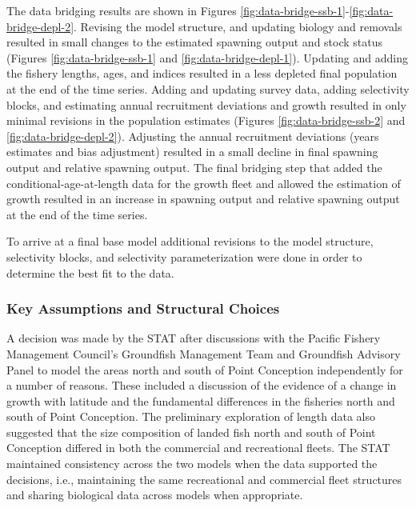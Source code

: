 \documentclass[11pt,
  letterpaper,
]{article}
\begin{document}
The data bridging results are shown in Figures \ref{fig:data-bridge-ssb-1}-\ref{fig:data-bridge-depl-2}. Revising the model structure, and updating biology and removals resulted in small changes to the estimated spawning output and stock status (Figures \ref{fig:data-bridge-ssb-1} and \ref{fig:data-bridge-depl-1}). Updating and adding the fishery lengths, ages, and indices resulted in a less depleted final population at the end of the time series. Adding and updating survey data, adding selectivity blocks, and estimating annual recruitment deviations and growth resulted in only minimal revisions in the population estimates (Figures \ref{fig:data-bridge-ssb-2} and \ref{fig:data-bridge-depl-2}). Adjusting the annual recruitment deviations (years estimates and bias adjustment) resulted in a small decline in final spawning output and relative spawning output. The final bridging step that added the conditional-age-at-length data for the growth fleet and allowed the estimation of growth resulted in an increase in spawning output and relative spawning output at the end of the time series.

To arrive at a final base model additional revisions to the model structure, selectivity blocks, and selectivity parameterization were done in order to determine the best fit to the data.

\subsubsection{Key Assumptions and Structural Choices}\label{key-assumptions-and-structural-choices}

A decision was made by the STAT after discussions with the Pacific Fishery Management Council's Groundfish Management Team and Groundfish Advisory Panel to model the areas north and south of Point Conception independently for a number of reasons. These included a discussion of the evidence of a change in growth with latitude and the fundamental differences in the fisheries north and south of Point Conception. The preliminary exploration of length data also suggested that the size composition of landed fish north and south of Point Conception differed in both the commercial and recreational fleets. The STAT maintained consistency across the two models when the data supported the decisions, i.e., maintaining the same recreational and commercial fleet structures and sharing biological data across models when appropriate.
\end{document}
